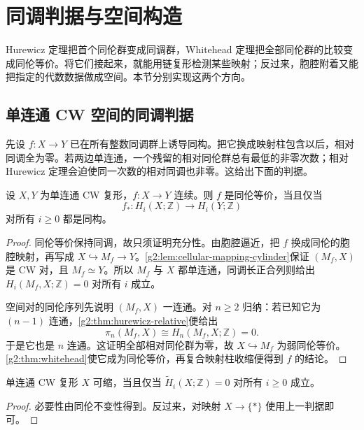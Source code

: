 
% 
% 

\section{同调判据与空间构造}
\label{g2:sec:0904}

Hurewicz 定理把首个同伦群变成同调群，Whitehead 定理把全部同伦群的比较变成同伦等价。将它们接起来，就能用链复形检测某些映射；反过来，胞腔附着又能把指定的代数数据做成空间。本节分别实现这两个方向。

\subsection{单连通 CW 空间的同调判据}
\label{g2:subsec:0904:01}

先设 \(f:X\to Y\) 已在所有整数同调群上诱导同构。把它换成映射柱包含以后，相对同调全为零。若两边单连通，一个残留的相对同伦群总有最低的非零次数；相对 Hurewicz 定理会迫使同一次数的相对同调也非零。这给出下面的判据。

\begin{theorem}\label{g2:thm:homological-whitehead}
	设 \(X,Y\) 为单连通 CW 复形，\(f:X\to Y\) 连续。则 \(f\) 是同伦等价，当且仅当
	\[
		f_*:H_i(X;\mathbb Z)\longrightarrow H_i(Y;\mathbb Z)
	\]
	对所有 \(i\ge0\) 都是同构。
\end{theorem}
\begin{proof}
	同伦等价保持同调，故只须证明充分性。由胞腔逼近，把 \(f\) 换成同伦的胞腔映射，再写成 \(X\hookrightarrow M_f\to Y\)。\cref{g2:lem:cellular-mapping-cylinder}保证 \((M_f,X)\) 是 CW 对，且 \(M_f\simeq Y\)。所以 \(M_f\) 与 \(X\) 都单连通，同调长正合列则给出 \(H_i(M_f,X;\mathbb Z)=0\) 对所有 \(i\) 成立。

	空间对的同伦序列先说明 \((M_f,X)\) 一连通。对 \(n\ge2\) 归纳：若已知它为 \((n-1)\) 连通，\cref{g2:thm:hurewicz-relative}便给出
	\[
		\pi_n(M_f,X)\cong H_n(M_f,X;\mathbb Z)=0.
	\]
	于是它也是 \(n\) 连通。这证明全部相对同伦群为零，故 \(X\hookrightarrow M_f\) 为弱同伦等价。\cref{g2:thm:whitehead}使它成为同伦等价，再复合映射柱收缩便得到 \(f\) 的结论。
\end{proof}

\begin{corollary}\label{g2:cor:simply-connected-acyclic}
	单连通 CW 复形 \(X\) 可缩，当且仅当 \(\widetilde H_i(X;\mathbb Z)=0\) 对所有 \(i\ge0\) 成立。
\end{corollary}
\begin{proof}
	必要性由同伦不变性得到。反过来，对映射 \(X\to\{*\}\) 使用上一判据即可。
\end{proof}

